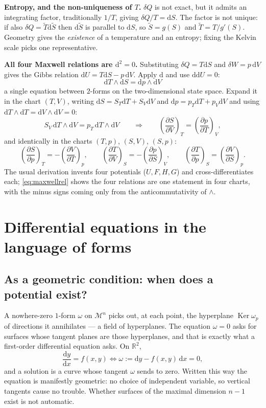 \documentclass[10pt,a4paper]{article}
\newcommand{\dd}{\mathrm{d}}
\newcommand{\R}{\mathbb{R}}
\newcommand{\M}{\mathcal{M}}
\newcommand{\pd}[2]{\frac{\partial #1}{\partial #2}}
\newcommand{\Ker}{\operatorname{Ker}}
\theoremstyle{plain}
\theoremstyle{definition}
\numberwithin{equation}{section}
\begin{document}
\textbf{Entropy, and the non-uniqueness of $T$.} $\delta Q$ is not exact, but it admits an
integrating factor, traditionally $1/T$, giving $\delta Q/T=\dd S$. The factor is not unique: if
also $\delta Q=\tilde T\dd\tilde S$ then $\dd\tilde S$ is parallel to $\dd S$, so
$\tilde S=g(S)$ and $\tilde T=T/g'(S)$. Geometry gives the \emph{existence} of a temperature and
an entropy; fixing the Kelvin scale picks one representative.

\textbf{All four Maxwell relations are $\dd^2=0$.} Substituting $\delta Q=T\dd S$ and
$\delta W=p\,\dd V$ gives the Gibbs relation $\dd U=T\dd S-p\,\dd V$. Apply $\dd$ and use
$\dd\dd U=0$:
\begin{equation}
\boxed{\ \dd T\wedge\dd S=\dd p\wedge\dd V\ }
\label{eq:maxwellrel}
\end{equation}
a single equation between $2$-forms on the two-dimensional state space. Expand it in the chart
$(T,V)$, writing $\dd S=S_T\dd T+S_V\dd V$ and $\dd p=p_T\dd T+p_V\dd V$ and using
$\dd T\wedge\dd T=\dd V\wedge\dd V=0$:
\begin{equation}
S_V\,\dd T\wedge\dd V=p_T\,\dd T\wedge\dd V
\qquad\Longrightarrow\qquad
\left(\pd{S}{V}\right)_{\!T}=\left(\pd{p}{T}\right)_{\!V},
\end{equation}
and identically in the charts $(T,p)$, $(S,V)$, $(S,p)$:
\begin{equation}
\left(\pd{S}{p}\right)_{\!T}\!=-\left(\pd{V}{T}\right)_{\!p}\!,\qquad
\left(\pd{T}{V}\right)_{\!S}\!=-\left(\pd{p}{S}\right)_{\!V}\!,\qquad
\left(\pd{T}{p}\right)_{\!S}\!=\left(\pd{V}{S}\right)_{\!p}\! .
\end{equation}
The usual derivation invents four potentials ($U,F,H,G$) and cross-differentiates each;
\eqref{eq:maxwellrel} shows the four relations are one statement in four charts, with the minus
signs coming only from the anticommutativity of $\wedge$.

\section{Differential equations in the language of forms}
\label{sec:de}

\subsection{As a geometric condition: when does a potential exist?}
\label{sec:frobenius}

A nowhere-zero $1$-form $\omega$ on $\M^n$ picks out, at each point, the hyperplane
$\Ker\omega_p$ of directions it annihilates --- a field of hyperplanes. The equation
$\omega=0$ asks for surfaces whose tangent planes are those hyperplanes, and that is exactly
what a first-order differential equation asks. On $\R^2$,
\begin{equation}
\frac{\dd y}{\dd x}=f(x,y)\iff\omega:=\dd y-f(x,y)\,\dd x=0 ,
\end{equation}
and a solution is a curve whose tangent $\omega$ sends to zero. Written this way the
equation is manifestly geometric: no choice of independent variable, so vertical tangents cause
no trouble. Whether surfaces of the maximal dimension $n-1$ exist is not automatic.
\end{document}
